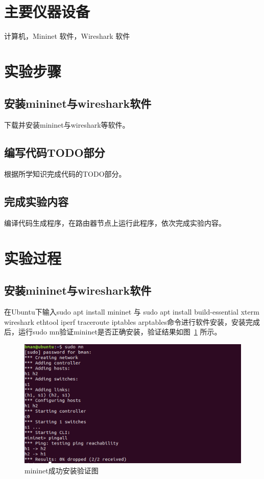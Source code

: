 \documentclass{zjureport}
\begin{document}
\section{主要仪器设备}
  计算机，Mininet 软件，Wireshark 软件

\section{实验步骤}
  \subsection{安装mininet与wireshark软件}
      下载并安装mininet与wireshark等软件。
  \subsection{编写代码TODO部分}
      根据所学知识完成代码的TODO部分。
  \subsection{完成实验内容}
      编译代码生成程序，在路由器节点上运行此程序，依次完成实验内容。

\section{实验过程}
  \subsection{安装mininet与wireshark软件}
     在Ubuntu下输入sudo apt install mininet 与 sudo apt install build-essential xterm wireshark ethtool iperf traceroute iptables arptables命令进行软件安装，安装完成后，运行sudo mn验证mininet是否正确安装，验证结果如图~\ref{fig:install} 所示。
           \begin{figure}[!htbp]
               \centering
               \includegraphics[width=0.7\linewidth]{figures/02.jpg}
               \caption{mininet成功安装验证图}
               \label{fig:install}
           \end{figure}
\end{document}
